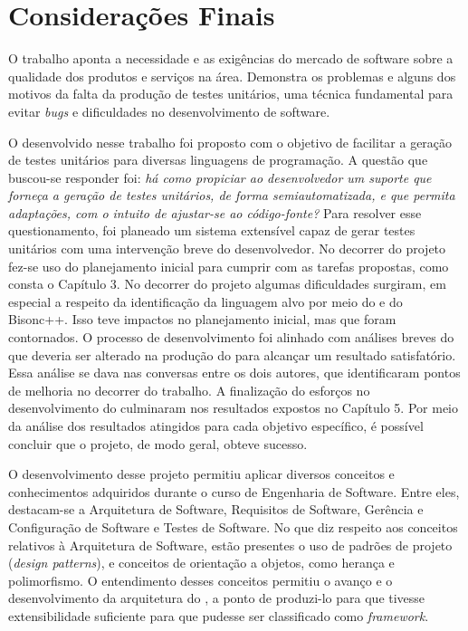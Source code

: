 \chapter[Considerações Finais]{Considerações Finais}
O trabalho aponta a necessidade e as exigências do mercado de software
sobre a qualidade dos produtos e serviços na área. Demonstra os problemas
e alguns dos motivos da falta da produção de testes unitários, uma técnica
fundamental para evitar \textit{bugs} e dificuldades no desenvolvimento
de software.

O \framework desenvolvido nesse trabalho foi proposto com o objetivo de
facilitar a geração de testes unitários para diversas linguagens de programação.
A questão que buscou-se responder foi: \textit{há como propiciar ao desenvolvedor
um suporte que forneça a geração de testes unitários, de forma
semiautomatizada, e que permita adaptações, com o intuito de ajustar-se ao
código-fonte?} Para resolver esse questionamento, foi planeado um 
sistema extensível capaz de gerar testes unitários com uma intervenção breve
do desenvolvedor. No decorrer do projeto fez-se uso do planejamento inicial
para cumprir com as tarefas propostas, como consta o Capítulo 3. No decorrer
do projeto algumas dificuldades surgiram, em especial a respeito da identificação
da linguagem alvo por meio do \flexcpp e do \textsf{Bisonc++}. Isso teve impactos
no planejamento inicial, mas que foram contornados. O processo de desenvolvimento
foi alinhado com análises breves do que deveria ser alterado na produção do
\framework para alcançar um resultado satisfatório. Essa análise se dava nas
conversas entre os dois autores, que identificaram pontos de melhoria no decorrer
do trabalho. A finalização do esforços no desenvolvimento do \framework culminaram
nos resultados expostos no Capítulo 5. Por meio da análise dos resultados
atingidos para cada objetivo específico, é possível concluir que o projeto, de
modo geral, obteve sucesso.

O desenvolvimento desse projeto permitiu aplicar diversos conceitos e conhecimentos
adquiridos durante o curso de Engenharia de Software. Entre eles, destacam-se a
Arquitetura de Software, Requisitos de Software, Gerência e Configuração de Software
e Testes de Software. No que diz respeito aos conceitos relativos à Arquitetura de
Software, estão presentes o uso de padrões de projeto (\textit{design patterns}), e
conceitos de orientação a objetos, como herança e polimorfismo. O entendimento desses
conceitos permitiu o avanço e o desenvolvimento da arquitetura do \Scarefault, a ponto de
produzi-lo para que tivesse extensibilidade suficiente para que pudesse ser classificado
como \textit{framework}.

